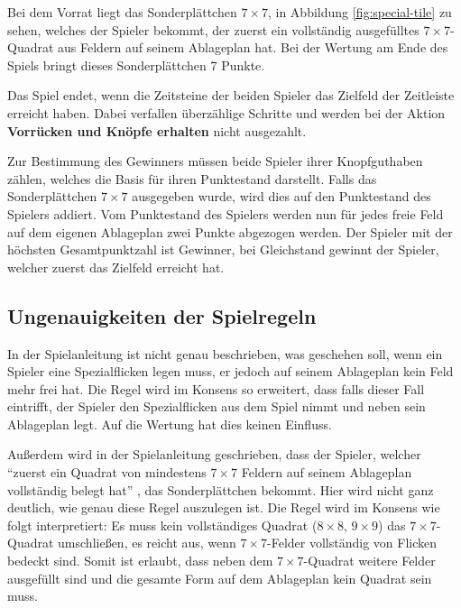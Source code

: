 Bei dem Vorrat liegt das Sonderplättchen $7\times7$, in Abbildung \ref{fig:special-tile} zu sehen, welches der Spieler bekommt, der zuerst ein vollständig ausgefülltes $7\times7$-Quadrat aus Feldern auf seinem Ablageplan hat. Bei der Wertung am Ende des Spiels bringt dieses Sonderplättchen 7 Punkte. \cite{2014.PatchworkSpielanleitung}

Das Spiel endet, wenn die Zeitsteine der beiden Spieler das Zielfeld der Zeitleiste erreicht haben. Dabei verfallen überzählige Schritte und werden bei der Aktion \textbf{Vorrücken und Knöpfe erhalten} nicht ausgezahlt. \cite{2014.PatchworkSpielanleitung}

Zur Bestimmung des Gewinners müssen beide Spieler ihrer Knopfguthaben zählen, welches die Basis für ihren Punktestand darstellt. Falls das Sonderplättchen $7\times7$ ausgegeben wurde, wird dies auf den Punktestand des Spielers addiert. Vom Punktestand des Spielers werden nun für jedes freie Feld auf dem eigenen Ablageplan zwei Punkte abgezogen werden. Der Spieler mit der höchsten Gesamtpunktzahl ist Gewinner, bei Gleichstand gewinnt der Spieler, welcher zuerst das Zielfeld erreicht hat. \cite{2014.PatchworkSpielanleitung}

\subsection*{Ungenauigkeiten der Spielregeln}

In der Spielanleitung ist nicht genau beschrieben, was geschehen soll, wenn ein Spieler eine Spezialflicken legen muss, er jedoch auf seinem Ablageplan kein Feld mehr frei hat. Die Regel wird im Konsens so erweitert, dass falls dieser Fall eintrifft, der Spieler den Spezialflicken aus dem Spiel nimmt und neben sein Ablageplan legt. Auf die Wertung hat dies keinen Einfluss. \cite{2014.DiscussionSpecialPatch}

Außerdem wird in der Spielanleitung geschrieben, dass der Spieler, welcher \enquote{zuerst ein Quadrat von mindestens $7\times7$ Feldern auf seinem Ablageplan vollständig belegt hat} \cite{2014.PatchworkSpielanleitung}, das Sonderplättchen bekommt. Hier wird nicht ganz deutlich, wie genau diese Regel auszulegen ist. Die Regel wird im Konsens wie folgt interpretiert: Es muss kein vollständiges Quadrat ($8\times8$, $9\times9$) das $7\times7$-Quadrat umschließen, es reicht aus, wenn $7\times7$-Felder vollständig von Flicken bedeckt sind. Somit ist erlaubt, dass neben dem $7\times7$-Quadrat weitere Felder ausgefüllt sind und die gesamte Form auf dem Ablageplan kein Quadrat sein muss. \cite{2014.Discussion7x7}

